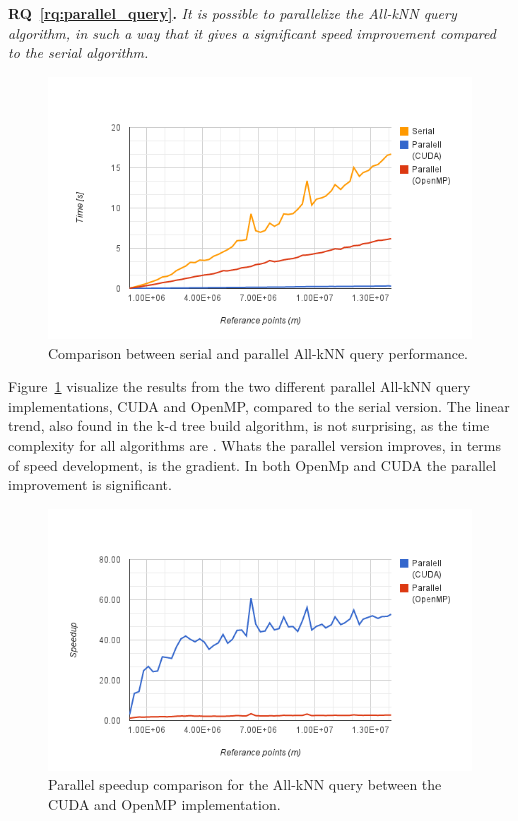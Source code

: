 \textbf{RQ~\ref{rq:parallel_query}.} \emph{It is possible to parallelize the All-kNN query algorithm, in such a way that it gives a significant speed improvement compared to the serial algorithm.}

\begin{figure}[ht!]
    \centering
    \includegraphics[width=120mm]{../gfx/final_kd_search.png}
    \caption{Comparison between serial and parallel All-kNN query performance.}
    \label{fig:final_kd_search}
\end{figure}

Figure~\ref{fig:final_kd_search} visualize the results from the two different parallel All-kNN query implementations, CUDA and OpenMP, compared to the serial version. The linear trend, also found in the k-d tree build algorithm, is not surprising, as the time complexity for all algorithms are . Whats the parallel version improves, in terms of speed development, is the gradient. In both OpenMp and CUDA the parallel improvement is significant.

\begin{figure}[ht!]
    \centering
    \includegraphics[width=120mm]{../gfx/final_kd_search_speedup.png}
    \caption{Parallel speedup comparison for the All-kNN query between the CUDA and OpenMP implementation.}
    \label{fig:final_kd_search_speedup}
\end{figure}


